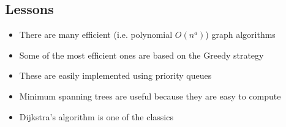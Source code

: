 
\begin{slide}
\section{Lessons}

\begin{PauseHighLight}
  \begin{itemize}
  \item There are many efficient (i.e. polynomial $O(n^a)$) graph
    algorithms\pause
  \item Some of the most efficient ones are based on the Greedy
    strategy\pause
  \item These are easily implemented using priority queues\pause
  \item Minimum spanning trees are useful because they are easy to
    compute\pause
  \item Dijkstra's algorithm is one of the classics\pause
  \end{itemize}
\end{PauseHighLight}

\end{slide}
